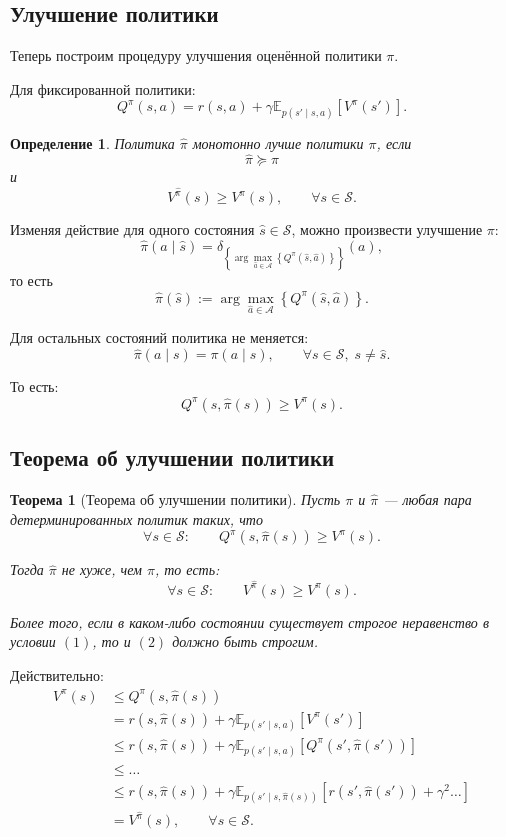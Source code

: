 \documentclass[12pt,a4paper]{article}
\newtheorem{theorem}{Теорема}
\newtheorem{definition}{Определение}
\begin{document}
\subsection{Улучшение политики}

Теперь построим процедуру улучшения оценённой политики $\pi$.

Для фиксированной политики:
\[
Q^\pi(s,a)
=
r(s,a)
+
\gamma
\mathbb E_{p(s'\mid s,a)}
\left[
V^\pi(s')
\right].
\]

\begin{definition}
Политика $\hat \pi$ монотонно лучше политики $\pi$, если
\[
\hat \pi \succeq \pi
\]
и
\[
V^{\hat \pi}(s) \ge V^\pi(s),
\qquad
\forall s \in \mathcal S.
\]
\end{definition}

Изменяя действие для одного состояния $\hat s \in \mathcal S$, можно произвести улучшение $\pi$:
\[
\hat \pi(a \mid \hat s)
=
\delta_{\left\{
\arg\max_{\hat a \in \mathcal A}
\left\{
Q^\pi(\hat s,\hat a)
\right\}
\right\}}(a),
\]
то есть
\[
\hat \pi(\hat s)
:=
\arg\max_{\hat a \in \mathcal A}
\left\{
Q^\pi(\hat s,\hat a)
\right\}.
\]

Для остальных состояний политика не меняется:
\[
\hat \pi(a \mid s)
=
\pi(a \mid s),
\qquad
\forall s \in \mathcal S,\; s \ne \hat s.
\]

То есть:
\[
Q^\pi(s,\hat \pi(s)) \ge V^\pi(s).
\]

\subsection{Теорема об улучшении политики}

\begin{theorem}[Теорема об улучшении политики]
Пусть $\pi$ и $\hat \pi$ --- любая пара детерминированных политик таких, что
\[
\forall s \in \mathcal S:
\qquad
Q^\pi(s,\hat \pi(s)) \ge V^\pi(s).
\tag{1}
\]

Тогда $\hat \pi$ не хуже, чем $\pi$, то есть:
\[
\forall s \in \mathcal S:
\qquad
V^{\hat \pi}(s) \ge V^\pi(s).
\tag{2}
\]

Более того, если в каком-либо состоянии существует строгое неравенство в условии $(1)$, то и $(2)$ должно быть строгим.
\end{theorem}

Действительно:
\[
\begin{aligned}
V^\pi(s)
&\le
Q^\pi(s,\hat \pi(s))
\\
&=
r(s,\hat \pi(s))
+
\gamma
\mathbb E_{p(s'\mid s,a)}
\left[
V^\pi(s')
\right]
\\
&\le
r(s,\hat \pi(s))
+
\gamma
\mathbb E_{p(s'\mid s,a)}
\left[
Q^\pi(s',\hat \pi(s'))
\right]
\\
&\le
\ldots
\\
&\le
r(s,\hat \pi(s))
+
\gamma
\mathbb E_{p(s'\mid s,\hat \pi(s))}
\left[
r(s',\hat \pi(s'))
+
\gamma^2 \ldots
\right]
\\
&=
V^{\hat \pi}(s),
\qquad
\forall s \in \mathcal S.
\end{aligned}
\]
\end{document}
